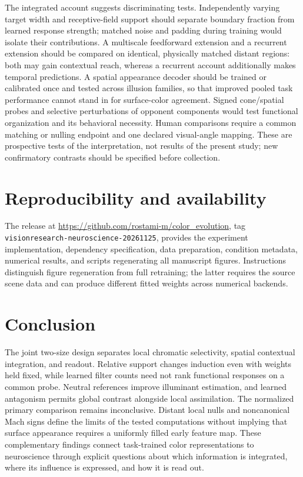 \documentclass[authoryear,preprint,review,12pt]{elsarticle}
\begin{document}
The integrated account suggests discriminating tests. Independently varying target width and receptive-field support should separate boundary fraction from learned response strength; matched noise and padding during training would isolate their contributions. A multiscale feedforward extension and a recurrent extension should be compared on identical, physically matched distant regions: both may gain contextual reach, whereas a recurrent account additionally makes temporal predictions. A spatial appearance decoder should be trained or calibrated once and tested across illusion families, so that improved pooled task performance cannot stand in for surface-color agreement. Signed cone/spatial probes and selective perturbations of opponent components would test functional organization and its behavioral necessity. Human comparisons require a common matching or nulling endpoint and one declared visual-angle mapping. These are prospective tests of the interpretation, not results of the present study; new confirmatory contrasts should be specified before collection.

\section{Reproducibility and availability}\label{sec:reproducibility}
The release at \url{https://github.com/rostami-m/color_evolution}, tag \texttt{visionresearch-neuroscience-20261125}, provides the experiment implementation, dependency specification, data preparation, condition metadata, numerical results, and scripts regenerating all manuscript figures. Instructions distinguish figure regeneration from full retraining; the latter requires the source scene data and can produce different fitted weights across numerical backends.


\section{Conclusion}
The joint two-size design separates local chromatic selectivity, spatial contextual integration, and readout. Relative support changes induction even with weights held fixed, while learned filter counts need not rank functional responses on a common probe. Neutral references improve illuminant estimation, and learned antagonism permits global contrast alongside local assimilation. The normalized primary comparison remains inconclusive. Distant local nulls and noncanonical Mach signs define the limits of the tested computations without implying that surface appearance requires a uniformly filled early feature map. These complementary findings connect task-trained color representations to neuroscience through explicit questions about which information is integrated, where its influence is expressed, and how it is read out.
\end{document}
